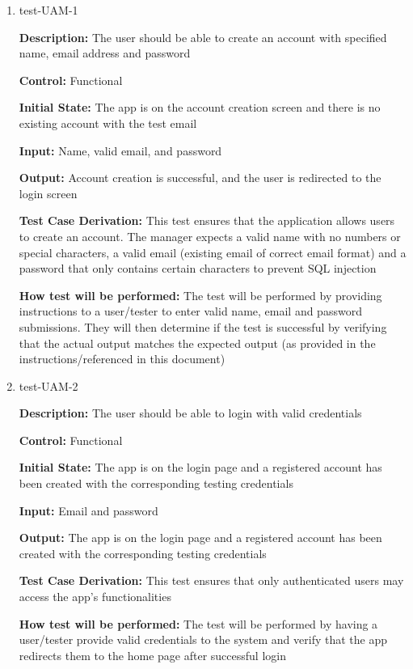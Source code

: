 \documentclass[12pt, titlepage]{article}
\begin{document}
\begin{enumerate}

\item{test-UAM-1\\}

\textbf{Description:} The user should be able to create an account with specified name, email address and password

\textbf{Control:} Functional
					
\textbf{Initial State:} The app is on the account creation screen and there is no existing account with the test email
					
\textbf{Input:} Name, valid email, and password
					
\textbf{Output:} Account creation is successful, and the user is redirected to the login screen

\textbf{Test Case Derivation:} This test ensures that the application allows users to create an account. The manager expects a valid name with no numbers or special characters, a valid email (existing email of correct email format) and a password that only contains certain characters to prevent SQL injection
					
\textbf{How test will be performed:} The test will be performed by providing instructions to a user/tester to enter valid name, email and password submissions. They will then determine if the test is successful by verifying that the actual output matches the expected output (as provided in the instructions/referenced in this document)

\item{test-UAM-2\\}

\textbf{Description:} The user should be able to login with valid credentials

\textbf{Control:} Functional
					
\textbf{Initial State:} The app is on the login page and a registered account has been created with the corresponding testing credentials
					
\textbf{Input:} Email and password
					
\textbf{Output:} The app is on the login page and a registered account has been created with the corresponding testing credentials

\textbf{Test Case Derivation:} This test ensures that only authenticated users may access the app's functionalities

\textbf{How test will be performed:} The test will be performed by having a user/tester provide valid credentials to the system and verify that the app redirects them to the home page after successful login


\end{enumerate}
\end{document}
